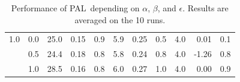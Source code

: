 \documentclass{beamer}
\def\PAL{\textsc{PAL}}
\begin{document}
\begin{frame}
\begin{table}[t]
\begin{tabular}{|l|l|r|r|r|r|r|r|r|r|r|}
1.0 & 0.0 &          25.0 &        0.15 &           0.9 & 
                      5.9 &        0.25 &           0.5 & 
                      4.0 &        0.01 &           0.1 \\
    & 0.5 &          24.4 &        0.18 &           0.8 & 
                      5.8 &        0.24 &           0.8 & 
                      4.0 &       -1.26 &           0.8 \\
    & 1.0 &          28.5 &        0.16 &           0.8 & 
                     6.0 &        0.27 &           1.0 & 
                      4.0 &        0.00 &           0.9 \\
\bottomrule
\end{tabular}
\caption{
\footnotesize
Performance of \PAL\ depending on
  $\alpha$, $\beta$, and $\epsilon$. Results are averaged on the 10
  runs. 
\label{fig:explanatory-exp-eval}}
\vspace*{-12pt}
\end{table}

\end{frame}
\end{document}
